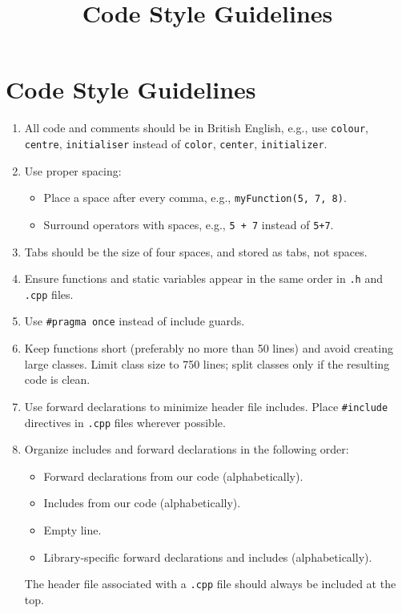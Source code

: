 \documentclass{article}
\title{Code Style Guidelines}
\author{}
\date{}
\begin{document}
\maketitle

\section*{Code Style Guidelines}

\begin{enumerate}[left=0pt, align=left]

    \item All code and comments should be in British English, e.g., use \texttt{colour}, \texttt{centre}, \texttt{initialiser} instead of \texttt{color}, \texttt{center}, \texttt{initializer}.

    \item Use proper spacing:
    \begin{itemize}
        \item Place a space after every comma, e.g., \texttt{myFunction(5, 7, 8)}.
        \item Surround operators with spaces, e.g., \texttt{5 + 7} instead of \texttt{5+7}.
    \end{itemize}

    \item Tabs should be the size of four spaces, and stored as tabs, not spaces.

    \item Ensure functions and static variables appear in the same order in \texttt{.h} and \texttt{.cpp} files.

    \item Use \texttt{\#pragma once} instead of include guards.

    \item Keep functions short (preferably no more than 50 lines) and avoid creating large classes. Limit class size to 750 lines; split classes only if the resulting code is clean.

    \item Use forward declarations to minimize header file includes. Place \texttt{\#include} directives in \texttt{.cpp} files wherever possible.

    \item Organize includes and forward declarations in the following order:
    \begin{itemize}
        \item Forward declarations from our code (alphabetically).
        \item Includes from our code (alphabetically).
        \item Empty line.
        \item Library-specific forward declarations and includes (alphabetically).
    \end{itemize}
    The header file associated with a \texttt{.cpp} file should always be included at the top.


\end{enumerate}
\end{document}
